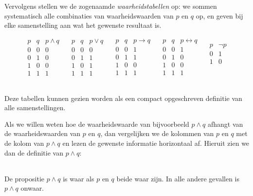 Vervolgens stellen we de zogenaamde \textit{waarheidstabellen} op: we sommen systematisch alle combinaties van waarheidswaarden van $p$ en $q$ op, en geven bij elke samenstelling aan wat het gewenste resultaat is. 
%
\begin{fullwidth}
$$
\begin{array}{ccc}
p&q&p\land q\\
\hline
0&0&0\\
0&1&0\\
1&0&0\\
1&1&1
\end{array}\quad 
\begin{array}{ccc}
p&q&p\lor q\\
\hline
0&0&0\\
0&1&1\\
1&0&1\\
1&1&1
\end{array}\quad
\begin{array}{ccc}
p&q&p\rightarrow q\\
\hline
0&0&1\\
0&1&1\\
1&0&0\\
1&1&1
\end{array}\quad
\begin{array}{ccc}
p&q&p\leftrightarrow q\\
\hline
0&0&1\\
0&1&0\\
1&0&0\\
1&1&1
\end{array}\quad
\begin{array}{cc}
p&\neg p\\
\hline
0&1\\
1&0\\
&\\
&
\end{array}
  $$\\[5mm]
\end{fullwidth}
%
Deze tabellen kunnen  gezien worden als een compact opgeschreven definitie van alle samenstellingen.

Als we willen weten hoe de waarheidswaarde van bijvoorbeeld $p\land q$ afhangt van de waarheidswaarden van $p$ en $q$, dan vergelijken we de kolommen van $p$ en $q$ met de kolom van $p\land q$ en lezen de gewenste informatie horizontaal af. Hieruit zien we dan de definitie van $p\land q$:
\begin{definition}[Conjunctie]\label{def:conj}\mbox{}\\
De propositie $p\land q$ is waar als $p$ en $q$ beide waar zijn. In alle andere gevallen is $p\land q$ onwaar.
\end{definition}

